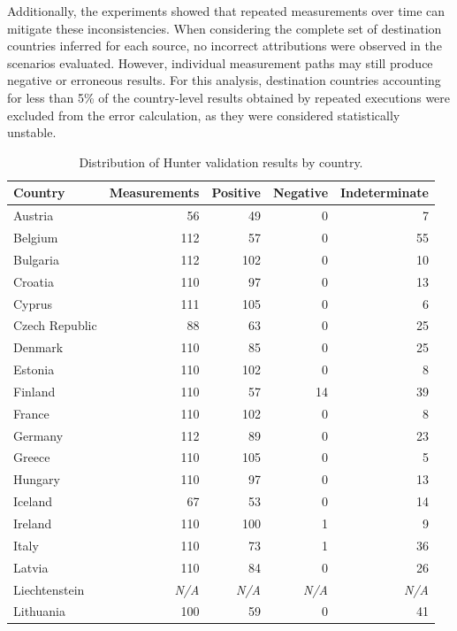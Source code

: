 \documentclass[
A4paper,                %
twoside,                %
openright,              %
chapterprefix=true,     %
12pt,                   %
headings=normal,        %
titlepage=on            %
]{book}
\begin{document}
Additionally, the experiments showed that repeated measurements over time can mitigate these inconsistencies. When considering the complete set of destination countries inferred for each source, no incorrect attributions were observed in the scenarios evaluated. However, individual measurement paths may still produce negative or erroneous results. For this analysis, destination countries accounting for less than 5\% of the country-level results obtained by repeated executions were excluded from the error calculation, as they were considered statistically unstable.

\begin{table}[ht]
    \centering
    \small
    \caption{Distribution of Hunter validation results by country.}
    \label{tab:hunter_validation_results_country}
    \begin{tabular}{lrrrr}
        \toprule
        \textbf{Country} & \textbf{Measurements} & \textbf{Positive} & \textbf{Negative} & \textbf{Indeterminate} \\
        \midrule
        Austria & 56 & 49 & 0 & 7 \\
        Belgium & 112 & 57 & 0 & 55 \\
        Bulgaria & 112 & 102 & 0 & 10 \\
        Croatia & 110 & 97 & 0 & 13 \\
        Cyprus & 111 & 105 & 0 & 6 \\
        Czech Republic & 88 & 63 & 0 & 25 \\
        Denmark & 110 & 85 & 0 & 25 \\
        Estonia & 110 & 102 & 0 & 8 \\
        Finland & 110 & 57 & 14 & 39 \\
        France & 110 & 102 & 0 & 8 \\
        Germany & 112 & 89 & 0 & 23 \\
        Greece & 110 & 105 & 0 & 5 \\
        Hungary & 110 & 97 & 0 & 13 \\
        Iceland & 67 & 53 & 0 & 14 \\
        Ireland & 110 & 100 & 1 & 9 \\
        Italy & 110 & 73 & 1 & 36 \\
        Latvia & 110 & 84 & 0 & 26 \\
        Liechtenstein & \textit{N/A} & \textit{N/A} & \textit{N/A} & \textit{N/A} \\
        Lithuania & 100 & 59 & 0 & 41 \\

\end{tabular}
\end{table}
\end{document}
